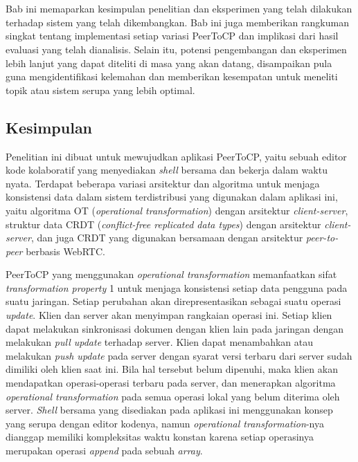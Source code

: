 \chapter{\kesimpulan}
\label{bab:6}
Bab ini memaparkan kesimpulan penelitian dan eksperimen yang telah dilakukan terhadap sistem yang telah dikembangkan. Bab ini juga memberikan rangkuman singkat tentang implementasi setiap variasi PeerToCP dan implikasi dari hasil evaluasi yang telah dianalisis. Selain itu, potensi pengembangan dan eksperimen lebih lanjut yang dapat diteliti di masa yang akan datang, disampaikan pula guna mengidentifikasi kelemahan dan memberikan kesempatan untuk meneliti topik atau sistem serupa yang lebih optimal.



\section{Kesimpulan}
\label{sec:kesimpulan}

Penelitian ini dibuat untuk mewujudkan aplikasi PeerToCP, yaitu sebuah editor kode kolaboratif yang menyediakan \textit{shell} bersama dan bekerja dalam waktu nyata. Terdapat beberapa variasi arsitektur dan algoritma untuk menjaga konsistensi data dalam sistem terdistribusi yang digunakan dalam aplikasi ini, yaitu algoritma OT (\textit{operational transformation}) dengan arsitektur \textit{client-server}, struktur data CRDT (\textit{conflict-free replicated data types}) dengan arsitektur \textit{client-server}, dan juga CRDT yang digunakan bersamaan dengan arsitektur \textit{peer-to-peer} berbasis WebRTC.

PeerToCP yang menggunakan \textit{operational transformation} memanfaatkan sifat \textit{transformation property} 1 untuk menjaga konsistensi setiap data pengguna pada suatu jaringan. Setiap perubahan akan direpresentasikan sebagai suatu operasi \textit{update}. Klien dan server akan menyimpan rangkaian operasi ini. Setiap klien dapat melakukan sinkronisasi dokumen dengan klien lain pada jaringan dengan melakukan \textit{pull update} terhadap server. Klien dapat menambahkan atau melakukan \textit{push update} pada server dengan syarat versi terbaru dari server sudah dimiliki oleh klien saat ini. Bila hal tersebut belum dipenuhi, maka klien akan mendapatkan operasi-operasi terbaru pada server, dan menerapkan algoritma \textit{operational transformation} pada semua operasi lokal yang belum diterima oleh server. \textit{Shell} bersama yang disediakan pada aplikasi ini menggunakan konsep yang serupa dengan editor kodenya, namun \textit{operational transformation}-nya dianggap memiliki kompleksitas waktu konstan karena setiap operasinya merupakan operasi \textit{append} pada sebuah \textit{array}.

